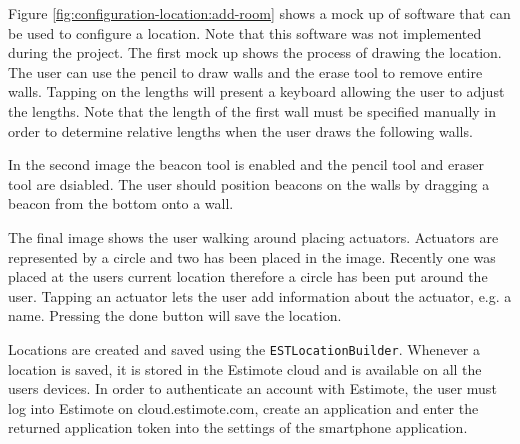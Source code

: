 Figure \ref{fig:configuration-location:add-room} shows a mock up of software that can be used to configure a location. Note that this software was not implemented during the project. The first mock up shows the process of drawing the location. The user can use the pencil to draw walls and the erase tool to remove entire walls. Tapping on the lengths will present a keyboard allowing the user to adjust the lengths. Note that the length of the first wall must be specified manually in order to determine relative lengths when the user draws the following walls.

In the second image the beacon tool is enabled and the pencil tool and eraser tool are dsiabled. The user should position beacons on the walls by dragging a beacon from the bottom onto a wall.

The final image shows the user walking around placing actuators. Actuators are represented by a circle and two has been placed in the image. Recently one was placed at the users current location therefore a circle has been put around the user. Tapping an actuator lets the user add information about the actuator, e.g. a name. Pressing the done button will save the location.

Locations are created and saved using the \texttt{ESTLocationBuilder}. Whenever a location is saved, it is stored in the Estimote cloud and is available on all the users devices. In order to authenticate an account with Estimote, the user must log into Estimote on cloud.estimote.com, create an application and enter the returned application token into the settings of the smartphone application.

